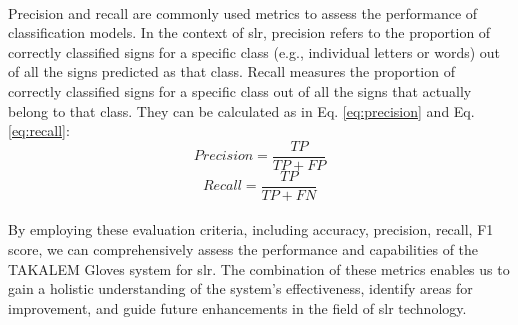 \paragraph{}
Precision and recall are commonly used metrics to assess the performance of classification models. In the context of \ac{slr}, precision refers to the proportion of correctly classified signs for a specific class (e.g., individual letters or words) out of all the signs predicted as that class. Recall measures the proportion of correctly classified signs for a specific class out of all the signs that actually belong to that class. They can be calculated as in Eq. \ref{eq:precision} and Eq. \ref{eq:recall}:
\begin{equation}
	Precision = \frac{TP}{TP + FP} \label{eq:f1}
\end{equation}
\begin{equation}
	Recall = \frac{TP}{TP + FN} \label{eq:f1-macro}
\end{equation}
\paragraph{}
By employing these evaluation criteria, including accuracy, precision, recall, F1 score, we can comprehensively assess the performance and capabilities of the TAKALEM Gloves system for \ac{slr}. The combination of these metrics enables us to gain a holistic understanding of the system's effectiveness, identify areas for improvement, and guide future enhancements in the field of \ac{slr} technology.